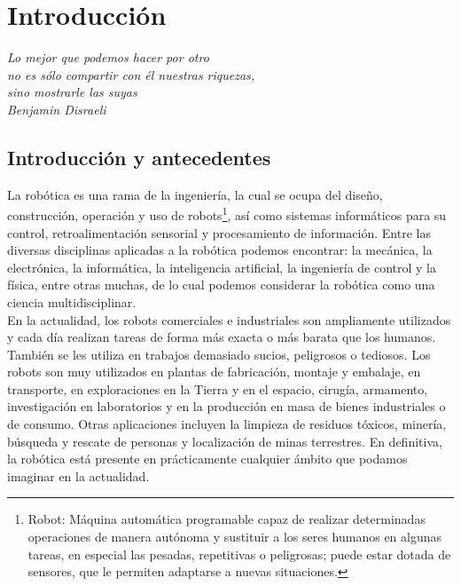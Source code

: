 

\newpage

\chapter{Introducción}
\label{chap:introducción}

\emph{Lo mejor que podemos hacer por otro\\ no es sólo compartir con él nuestras riquezas,\\ sino mostrarle las suyas\\ Benjamin Disraeli}\\


\section{Introducción y antecedentes}
\label{sec:introduccion_y_antecedentes}

La robótica es una rama de la ingeniería, la cual se ocupa del diseño, construcción, operación y uso de robots\footnote{Robot: Máquina automática programable capaz de 
realizar determinadas operaciones de manera autónoma y sustituir a los seres humanos en algunas tareas, en especial las pesadas, repetitivas o peligrosas; puede estar dotada de sensores, 
que le permiten adaptarse a nuevas situaciones.}, así como sistemas informáticos para su control, retroalimentación sensorial y procesamiento de información. Entre las diversas disciplinas aplicadas
a la robótica podemos encontrar: la mecánica, la electrónica, la informática, la inteligencia artificial, la ingeniería de control y la física, entre otras muchas, de lo cual podemos considerar 
la robótica como una ciencia multidisciplinar.\\

En la actualidad, los robots comerciales e industriales son ampliamente utilizados y cada día realizan tareas de forma más exacta o más barata que los humanos. También se les utiliza en trabajos demasiado sucios,
peligrosos o tediosos. Los robots son muy utilizados en plantas de fabricación, montaje y embalaje, en transporte, en exploraciones en la Tierra y en el espacio, cirugía, armamento, investigación en laboratorios y 
en la producción en masa de bienes industriales o de consumo. Otras aplicaciones incluyen la limpieza de residuos tóxicos, minería, búsqueda y rescate de personas y localización de minas terrestres. En definitiva, 
la robótica está presente en prácticamente cualquier ámbito que podamos imaginar en la actualidad.\\

